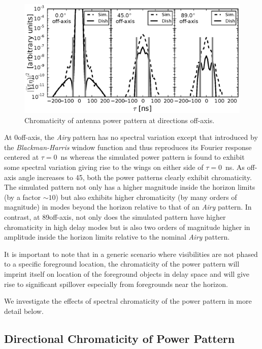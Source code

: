 \documentclass[preprint2,iop,numberedappendix,twocolappendix,appendixfloats]{emulateapj}
\begin{document}
\begin{figure}[htb]
\centering
\includegraphics[width=\linewidth]{off-axis_point_source_beam_chromaticity.eps}
\caption{Chromaticity of antenna power pattern at directions off-axis. }
\label{fig:off-axis-beam-chromaticity}
\end{figure}

At 0\arcdeg off-axis, the {\it Airy} pattern has no spectral variation except that introduced by the {\it Blackman-Harris} window function and thus reproduces its Fourier response centered at $\tau = 0$~ns whereas the simulated power pattern is found to exhibit some spectral variation giving rise to the wings on either side of $\tau = 0$~ns. As off-axis angle increases to 45\arcdeg, both the power patterns clearly exhibit chromaticity. The simulated pattern not only has a higher magnitude inside the horizon limits (by a factor $\sim 10$) but also exhibits higher chromaticity (by many orders of magnitude) in modes beyond the horizon relative to that of an {\it Airy} pattern. In contrast, at 89\arcdeg off-axis, not only does the simulated pattern have higher chromaticity in high delay modes but is also two orders of magnitude higher in amplitude inside the horizon limits relative to the nominal {\it Airy} pattern.

It is important to note that in a generic scenario where visibilities are not phased to a specific foreground location, the chromaticity of the power pattern will imprint itself on location of the foreground objects in delay space and will give rise to significant spillover especially from foregrounds near the horizon. 

We investigate the effects of spectral chromaticity of the power pattern in more detail below.

\subsection{Directional Chromaticity of Power Pattern}\label{sec:directional-chromaticity}
\end{document}
